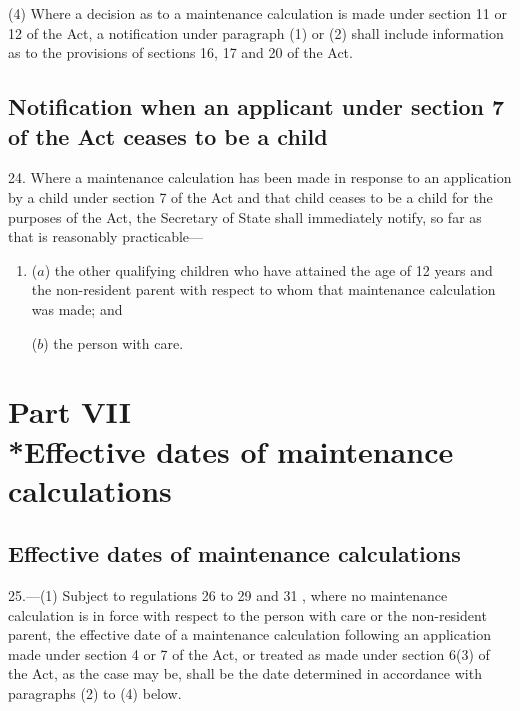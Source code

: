 \documentclass[12pt,a4paper]{article}
\begin{document}
(4) Where a decision as to a maintenance calculation is made under section 11 or 12 of the Act, a notification under paragraph (1) or (2) shall include information as to the provisions of sections 16, 17 and 20 of the Act.

\subsection[24. Notification when an applicant under section 7 of the Act ceases to be a child]{Notification when an applicant under section 7 of the Act ceases to be a child}

24.  Where a maintenance calculation has been made in response to an application by a child under section 7 of the Act and that child ceases to be a child for the purposes of the Act, the Secretary of State shall immediately notify, so far as that is reasonably practicable—
\begin{enumerate}\item[]
($a$) the other qualifying children who have attained the age of 12 years and the non-resident parent with respect to whom that maintenance calculation was made; and

($b$) the person with care.
\end{enumerate}

\section[Part VII --- Effective dates of maintenance calculations]{Part VII\\*Effective dates of maintenance calculations}

\renewcommand\parthead{--- Part VII}

\subsection[25. Effective dates of maintenance calculations]{Effective dates of maintenance calculations}

25.---(1)  Subject to regulations 26 to 29
and 31%
, where no maintenance calculation is in force with respect to the person with care or the non-resident parent, the effective date of a maintenance calculation following an application made under section 4 or 7 of the Act, or treated as made under section 6(3) of the Act, as the case may be, shall be the date determined in accordance with paragraphs (2) to (4) below.
\end{document}

